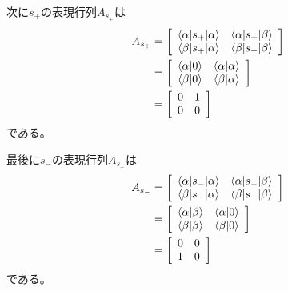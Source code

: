 次に$s_+$の表現行列$A_{s_+}$は
\begin{align}
	A_{s_+}
&=
	\left[
	\begin{array}{cc}
		\braket{\alpha|s_+|\alpha} &
		\braket{\alpha|s_+|\beta} \\
		\braket{\beta|s_+|\alpha} &
		\braket{\beta|s_+|\beta}
	\end{array}
	\right] \\
%
%
&=
	\left[
	\begin{array}{cc}
		\braket{\alpha|0} &
		\braket{\alpha|\alpha} \\
		\braket{\beta|0} &
		\braket{\beta|\alpha}
	\end{array}
	\right] \\
%
%
&=
	\left[
	\begin{array}{cc}
		0 & 1 \\
		0 & 0
	\end{array}
	\right]
\end{align}
である。

最後に$s_-$の表現行列$A_{s_-}$は
\begin{align}
	A_{s_-}
&=
	\left[
	\begin{array}{cc}
		\braket{\alpha|s_-|\alpha} &
		\braket{\alpha|s_-|\beta} \\
		\braket{\beta|s_-|\alpha} &
		\braket{\beta|s_-|\beta}
	\end{array}
	\right] \\
%
%
&=
	\left[
	\begin{array}{cc}
		\braket{\alpha|\beta} &
		\braket{\alpha|0} \\
		\braket{\beta|\beta} &
		\braket{\beta|0}
	\end{array}
	\right] \\
%
%
&=
	\left[
	\begin{array}{cc}
		0 & 0 \\
		1 & 0
	\end{array}
	\right]
\end{align}
である。

